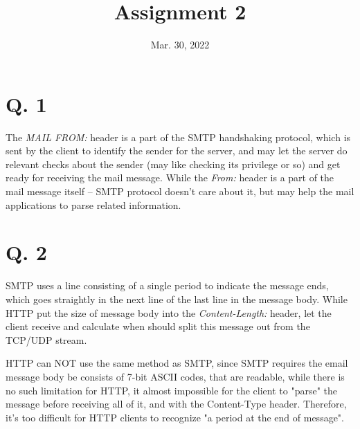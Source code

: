 \documentclass[onecolumn, oneside, ctexart]{SUSTechHomework}
\title{Assignment 2}
\date{Mar. 30, 2022}
\begin{document}
\maketitle

\section*{Q. 1}
The \emph{MAIL FROM:} header is a part of the SMTP handshaking protocol, which is sent by the client to identify the sender for the server, and may let the server do relevant checks about the sender (may like checking its privilege or so) and get ready for receiving the mail message. While the \emph{From:} header is a part of the mail message itself -- SMTP protocol doesn't care about it, but may help the mail applications to parse related information.

\section*{Q. 2}
SMTP uses a line consisting of a single period to indicate the message ends, which goes straightly in the next line of the last line in the message body. While HTTP put the size of message body into the \emph{Content-Length:} header, let the client receive and calculate when should split this message out from the TCP/UDP stream.
\par HTTP can NOT use the same method as SMTP, since SMTP requires the email message body be consists of 7-bit ASCII codes, that are readable, while there is no such limitation for HTTP, it almost impossible for the client to "parse" the message before receiving all of it, and with the Content-Type header. Therefore, it's too difficult for HTTP clients to recognize "a period at the end of message".
\end{document}
